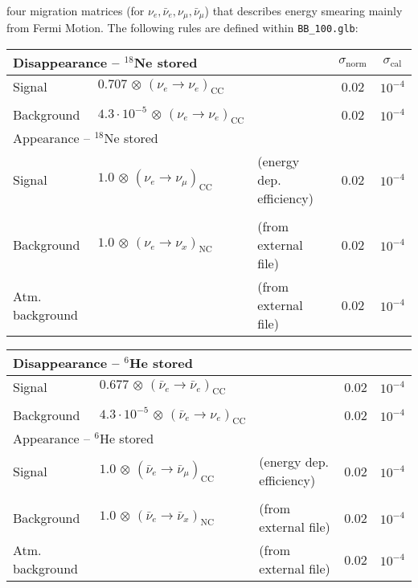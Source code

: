 four migration matrices (for $\nu_e , \bar{\nu}_e ,\nu_{\mu} ,\bar{\nu}_\mu$) that describes energy smearing mainly
from Fermi Motion. The following rules are defined within {\tt BB\_100.glb}:
\begin{center}
\begin{tabular}{|l|ll|c|c|}
\hline \hline
\multicolumn{3}{|l|}{Disappearance -- $^{18}$Ne stored} & $\sigma_\mathrm{norm}$ & $\sigma_\mathrm{cal}$ \\ \hline
Signal & $0.707 \, \otimes \, (\nu_e\rightarrow\nu_e)_{\mathrm{CC}}$ & & 0.02 & $10^{-4}$ \\
 & & & & \\
Background & $4.3\cdot 10^{-5} \, \otimes \, (\nu_e \rightarrow \nu_e)_\mathrm{CC}$ & & 0.02 & $10^{-4}$ \\ \hline \hline 
\multicolumn{3}{|l|}{Appearance -- $^{18}$Ne stored} & & \\ \hline
Signal & $1.0 \, \otimes \, (\nu_e \rightarrow \nu_\mu)_\mathrm{CC}$ & (energy dep. efficiency) & 0.02 & $10^{-4}$ \\
 & & & & \\
Background & $1.0 \, \otimes \, (\nu_e \rightarrow \nu_x)_\mathrm{NC}$ & (from external file) & 0.02 & $10^{-4}$ \\
Atm. background & & (from external file) & 0.02 & $10^{-4}$ \\ \hline \hline
\end{tabular}
\end{center}
\begin{center}
\begin{tabular}{|l|ll|c|c|}
\hline \hline
\multicolumn{3}{|l|}{Disappearance -- $^6$He stored} & &  \\ \hline
Signal & $0.677 \, \otimes \, (\bar{\nu}_e\rightarrow\bar{\nu}_e)_{\mathrm{CC}}$ & & 0.02 & $10^{-4}$ \\
 & & & & \\
Background & $4.3\cdot 10^{-5} \, \otimes \, (\bar{\nu}_e \rightarrow \nu_e)_\mathrm{CC}$ & & 0.02 & $10^{-4}$ \\ \hline \hline 
\multicolumn{3}{|l|}{Appearance -- $^6$He stored} & & \\ \hline
Signal & $1.0 \, \otimes \, (\bar{\nu}_e \rightarrow \bar{\nu}_\mu)_\mathrm{CC}$ & (energy dep. efficiency) & 0.02 & $10^{-4}$ \\
 & & & & \\
Background & $1.0 \, \otimes \, (\bar{\nu}_e \rightarrow \bar{\nu}_x)_\mathrm{NC}$ & (from external file) & 0.02 & $10^{-4}$ \\
Atm. background & & (from external file) & 0.02 & $10^{-4}$ \\ \hline \hline
\end{tabular}
\end{center}

